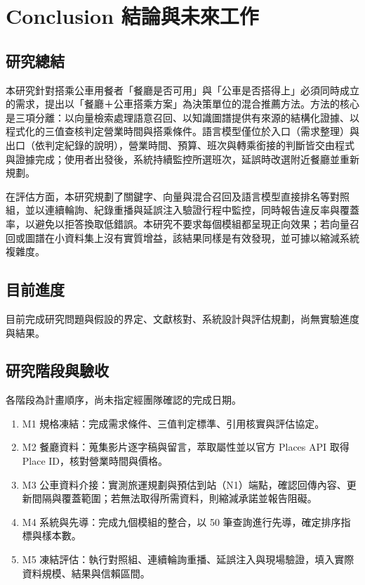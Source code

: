 \chapter{Conclusion 結論與未來工作}

\section{研究總結}

本研究針對搭乘公車用餐者「餐廳是否可用」與「公車是否搭得上」必須同時成立的需求，提出以「餐廳＋公車搭乘方案」為決策單位的混合推薦方法。方法的核心是三項分離：以向量檢索處理語意召回、以知識圖譜提供有來源的結構化證據、以程式化的三值查核判定營業時間與搭乘條件。語言模型僅位於入口（需求整理）與出口（依判定紀錄的說明），營業時間、預算、班次與轉乘銜接的判斷皆交由程式與證據完成；使用者出發後，系統持續監控所選班次，延誤時改選附近餐廳並重新規劃。


在評估方面，本研究規劃了關鍵字、向量與混合召回及語言模型直接排名等對照組，並以連續輪詢、紀錄重播與延誤注入驗證行程中監控，同時報告違反率與覆蓋率，以避免以拒答換取低錯誤。本研究不要求每個模組都呈現正向效果；若向量召回或圖譜在小資料集上沒有實質增益，該結果同樣是有效發現，並可據以縮減系統複雜度。


\section{目前進度}

目前完成研究問題與假設的界定、文獻核對、系統設計與評估規劃，尚無實驗進度與結果。


\section{研究階段與驗收}

各階段為計畫順序，尚未指定經團隊確認的完成日期。


\begin{enumerate}
\item M1 規格凍結：完成需求條件、三值判定標準、引用核實與評估協定。
\item M2 餐廳資料：蒐集影片逐字稿與留言，萃取屬性並以官方 Places API 取得 Place ID，核對營業時間與價格。
\item M3 公車資料介接：實測旅運規劃與預估到站（N1）端點，確認回傳內容、更新間隔與覆蓋範圍；若無法取得所需資料，則縮減承諾並報告阻礙。
\item M4 系統與先導：完成九個模組的整合，以 50 筆查詢進行先導，確定排序指標與樣本數。
\item M5 凍結評估：執行對照組、連續輪詢重播、延誤注入與現場驗證，填入實際資料規模、結果與信賴區間。
\end{enumerate}

